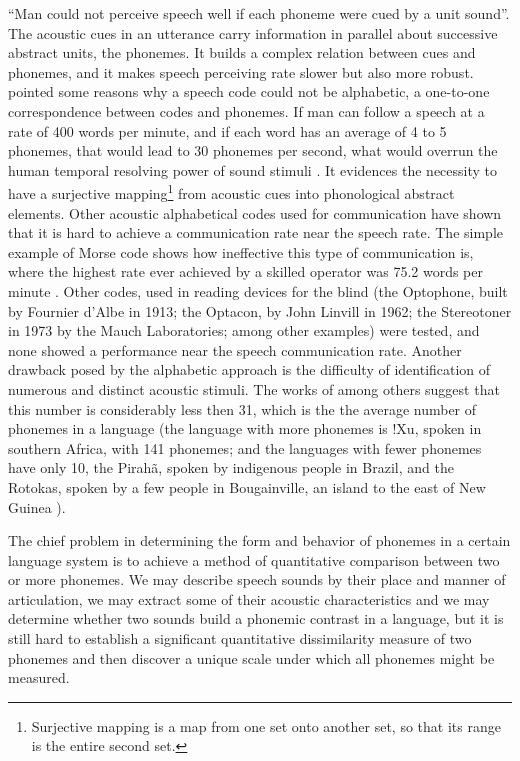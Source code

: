 ``Man could not perceive speech well if each phoneme were cued by a unit sound''\citep{liberman1967}. The acoustic cues in an utterance carry information in parallel about successive abstract units, the phonemes. It builds a complex relation between cues and phonemes, and it makes speech perceiving rate slower but also more robust. \cite{liberman1967} pointed some reasons why a speech code could not be alphabetic, a one-to-one correspondence between codes and phonemes. If man can follow a speech at a rate of 400 words per minute, and if each word has an average of 4 to 5 phonemes, that would lead to 30 phonemes per second, what would overrun the human temporal resolving power of sound stimuli \citep{miller1948}. It evidences the necessity to have a surjective mapping\footnote{Surjective mapping is a map from one set onto another set, so that its range is the entire second set.} from acoustic cues into phonological abstract elements. Other acoustic alphabetical codes used for communication have shown that it is hard to achieve a communication rate near the speech rate. The simple example of Morse code shows how ineffective this type of communication is, where the highest rate ever achieved by a skilled operator was 75.2 words per minute \citep{pierpont2002}. Other codes, used in reading devices for the blind (the Optophone, built by Fournier d'Albe in 1913; the Optacon, by John Linvill in 1962; the Stereotoner in 1973 by the Mauch Laboratories; among other examples) were tested, and none showed a performance near the speech communication rate. Another drawback posed by the alphabetic approach is the difficulty of identification of numerous and distinct acoustic stimuli. The works of \cite{miller1956,pollack1952} among others suggest that this number is considerably less then 31, which is the the average number of phonemes in a language (the language with more phonemes is !Xu, spoken in southern Africa, with 141 phonemes; and the languages with fewer phonemes have only 10, the Pirah\~a, spoken by indigenous people in Brazil, and the Rotokas, spoken by a few people in Bougainville, an island to the east of New Guinea \citep{maddieson1884}).

The chief problem in determining the form and behavior of phonemes in a certain language system is to achieve a method of quantitative comparison between two or more phonemes. We may describe speech sounds by their place and manner of articulation, we may extract some of their acoustic characteristics and we may determine whether two sounds build a phonemic contrast in a language, but it is still hard to establish a significant quantitative dissimilarity measure of two phonemes and then discover a unique scale under which all phonemes might be measured. 

